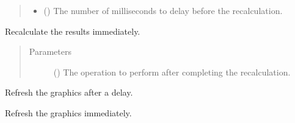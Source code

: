 \documentclass[letterpaper,10pt,english]{sphinxmanual}
\begin{document}
\begin{fulllineitems}
\begin{fulllineitems}
\begin{quote}
\begin{description}
\begin{itemize}
\item {} 
 () \textendash{} The number of milliseconds to delay before the recalculation.

\end{itemize}

\end{description}\end{quote}

\end{fulllineitems}


\begin{fulllineitems}
\label{\detokenize{tyche:tyche.DecisionGUI.DecisionWindow.reevaluate_immediate}}
Recalculate the results immediately.
\begin{quote}\begin{description}
\item[{Parameters}] \leavevmode
{} () \textendash{} The operation to perform after completing the recalculation.

\end{description}\end{quote}

\end{fulllineitems}


\begin{fulllineitems}
\label{\detokenize{tyche:tyche.DecisionGUI.DecisionWindow.refresh}}
Refresh the graphics after a delay.

\end{fulllineitems}


\begin{fulllineitems}
\label{\detokenize{tyche:tyche.DecisionGUI.DecisionWindow.refresh_immediate}}
Refresh the graphics immediately.

\end{fulllineitems}


\end{fulllineitems}
\end{document}
